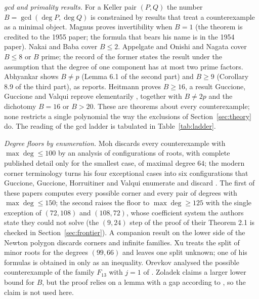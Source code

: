 \documentclass[11pt]{article}
\theoremstyle{remark}
\begin{document}
\emph{gcd and primality results.} For a Keller pair $(P,Q)$ the number $B=\gcd(\deg P,\deg Q)$
is constrained by results that treat a counterexample as a minimal object. Magnus
\cite{Magnus1955} proves invertibility when $B=1$ (the theorem is credited to the 1955 paper;
the formula that bears his name is in the 1954 paper). Nakai and Baba \cite{NakaiBaba1977}
cover $B\le 2$. Appelgate and Onishi \cite{AppelgateOnishi1985} and Nagata \cite{Nagata1989}
cover $B\le 8$ or $B$ prime; the record of the former states the result under the assumption
that the degree of one component has at most two prime factors. Abhyankar \cite{Abhyankar2008}
shows $B\ne p$ (Lemma 6.1 of the second part) and $B\ge 9$ (Corollary 8.9 of the third part), as \cite{GGV2017} reports. Heitmann
\cite{Heitmann1990} proves $B\ge 16$, a result Guccione, Guccione and Valqui reprove
elementarily \cite{GGV2017}, together with $B\ne 2p$ and the dichotomy $B=16$ or $B>20$. These are
theorems about every counterexample; none restricts a single polynomial the way the exclusions
of Section~\ref{sec:theory} do. The reading of the gcd ladder is tabulated in
Table~\ref{tab:ladder}.

\emph{Degree floors by enumeration.} Moh \cite{Moh1983} discards every counterexample with
$\max\deg\le 100$ by an analysis of configurations of roots, with complete published detail
only for the smallest case, of maximal degree $64$; the modern corner terminology turns his four exceptional cases into
six configurations that Guccione, Guccione, Horruitiner and Valqui enumerate and discard
\cite{GGHV2017, GGHV2022}. The first of these papers computes every possible corner and every
pair of degrees with $\max\deg\le150$; the second raises the floor to $\max\deg\ge125$ with the
single exception of $(72,108)$ and $(108,72)$, whose coefficient system the authors
state they could not solve (the $(9,24)$ step of the proof of their Theorem 2.1 is checked in Section~\ref{sec:frontier}). A companion result on the lower side of the Newton polygon
\cite{GGV2} discards corners and infinite families. Xu \cite{Xu2016} treats the
split of minor roots for the degrees $(99,66)$ and leaves one split unknown; one of his formulas
is obtained in \cite{GGHVApproxRoots} only as an inequality. Orevkov \cite{Orevkov2001}
analysed the possible counterexample of the family $F_{13}$ with $j=1$ of \cite{GGHV2017}. Zoladek
\cite{Zoladek2008} claims a larger lower bound for $B$, but the proof relies on a lemma with a
gap according to \cite{GGV2017}, so the claim is not used here.
\end{document}
